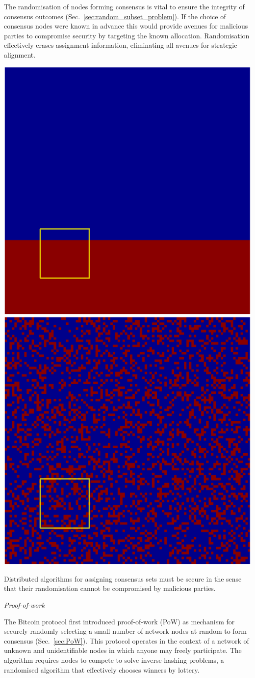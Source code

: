 The randomisation of nodes forming consensus is vital to ensure the integrity of consensus outcomes (Sec.~\ref{sec:random_subset_problem}). If the choice of consensus nodes were known in advance this would provide avenues for malicious parties to compromise security by targeting the known allocation. Randomisation effectively erases assignment information, eliminating all avenues for strategic alignment.

\begin{center}
	\includegraphics[width=0.4\columnwidth]{figs/strategy_entropy_S_p03.pdf}
	\includegraphics[width=0.4\columnwidth]{figs/strategy_entropy_R_p03.pdf}
\end{center}

Distributed algorithms for assigning consensus sets must be secure in the sense that their randomisation cannot be compromised by malicious parties.

\begin{center}\emph{Proof-of-work}\end{center}

The Bitcoin protocol \cite{Nakamoto08} first introduced proof-of-work (PoW) as mechanism for securely randomly selecting a small number of network nodes at random to form consensus (Sec.~\ref{sec:PoW}). This protocol operates in the context of a network of unknown and unidentifiable nodes in which anyone may freely participate. The algorithm requires nodes to compete to solve inverse-hashing problems, a randomised algorithm that effectively chooses winners by lottery.

